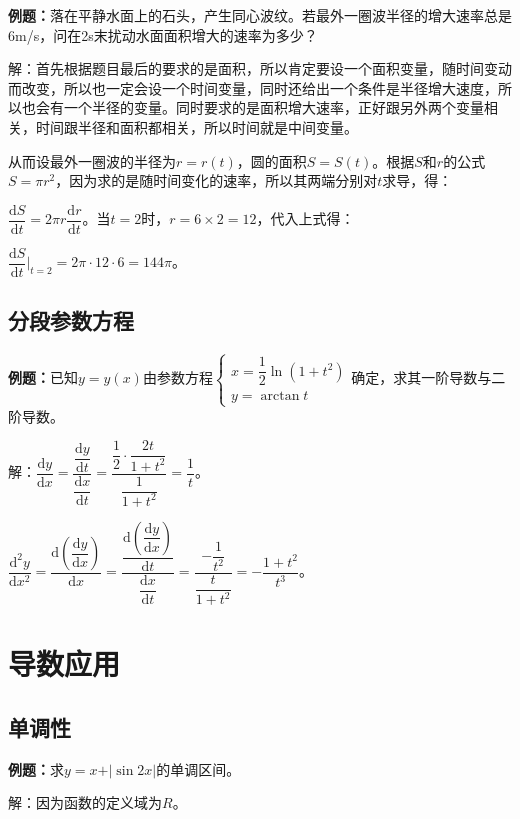 \documentclass[UTF8, 12pt]{ctexart}
\begin{document}
\textbf{例题：}落在平静水面上的石头，产生同心波纹。若最外一圈波半径的增大速率总是6m/s，问在2s末扰动水面面积增大的速率为多少？

解：首先根据题目最后的要求的是面积，所以肯定要设一个面积变量，随时间变动而改变，所以也一定会设一个时间变量，同时还给出一个条件是半径增大速度，所以也会有一个半径的变量。同时要求的是面积增大速率，正好跟另外两个变量相关，时间跟半径和面积都相关，所以时间就是中间变量。

从而设最外一圈波的半径为$r=r(t)$，圆的面积$S=S(t)$。根据$S$和$r$的公式$S=\pi r^2$，因为求的是随时间变化的速率，所以其两端分别对$t$求导，得：

$\dfrac{\textrm{d}S}{\textrm{d}t}=2\pi r\dfrac{\textrm{d}r}{\textrm{d}t}$。当$t=2$时，$r=6\times2=12$，代入上式得：\medskip

$\dfrac{\textrm{d}S}{\textrm{d}t}\bigg|_{t=2}=2\pi\cdot12\cdot6=144\pi$。

\subsection{分段参数方程}

\textbf{例题：}已知$y=y(x)$由参数方程$\left\{\begin{array}{lcl}
    x=\dfrac{1}{2}\ln(1+t^2) \\
    y=\arctan t
\end{array}
\right.$确定，求其一阶导数与二阶导数。

解：$\dfrac{\textrm{d}y}{\textrm{d}x}=\dfrac{\dfrac{\textrm{d}y}{\textrm{d}t}}{\dfrac{\textrm{d}x}{\textrm{d}t}}=\dfrac{\dfrac{1}{2}\cdot\dfrac{2t}{1+t^2}}{\dfrac{1}{1+t^2}}=\dfrac{1}{t}$。

$\dfrac{\textrm{d}^2y}{\textrm{d}x^2}=\dfrac{\textrm{d}\left(\dfrac{\textrm{d}y}{\textrm{d}x}\right)}{\textrm{d}x}=\dfrac{\dfrac{\textrm{d}\left(\dfrac{\textrm{d}y}{\textrm{d}x}\right)}{\textrm{d}t}}{\dfrac{\textrm{d}x}{\textrm{d}t}}=\dfrac{-\dfrac{1}{t^2}}{\dfrac{t}{1+t^2}}=-\dfrac{1+t^2}{t^3}$。

\section{导数应用}

\subsection{单调性}

\textbf{例题：}求$y=x+\vert\sin 2x\vert$的单调区间。

解：因为函数的定义域为$R$。
\end{document}
